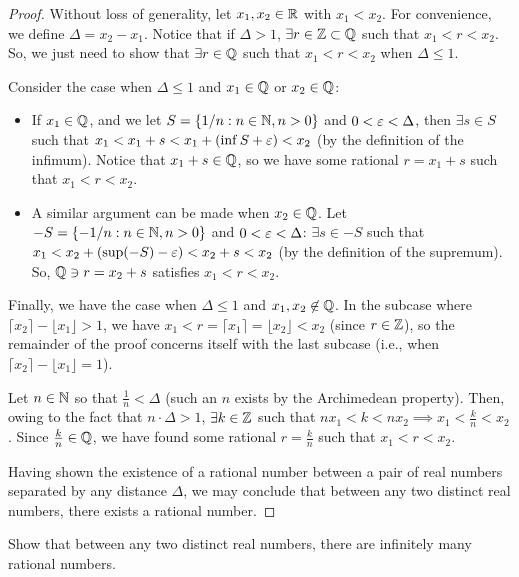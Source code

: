 \begin{proof}
  Without loss of generality, let $x_{1}, x_{2} \in \mathbb{R}$ with
  $x_{1} < x_{2}$. For convenience, we define $\Delta = x_{2} - x_{1}$. Notice
  that if $\Delta > 1$, $\exists r \in \mathbb{Z} \subset \mathbb{Q}$ such that $x_1 < r < x_2$. So, 
  we just need to show that $\exists r \in \mathbb{Q}$ such that $x_{1} < r < x_{2}$ when 
  $\Delta \leq 1$.

  Consider the case when $\Delta \leq 1$ and $x_{1} \in \mathbb{Q}$ or $x_{2} \in \mathbb{Q}$:
  \begin{itemize}
    \item If $x_{1} \in \mathbb{Q}$, and we let $S = \{ 1/n : n \in \mathbb{N}, n > 0 \}$ and
      $0 < \varepsilon < \Delta$, then $\exists s \in S$ such that 
      $x_{1} < x_{1} + s < x_{1} + (\inf S + \varepsilon) < x_{2}$ (by the definition 
      of the infimum). Notice that $x_1 + s \in \mathbb{Q}$, so we have some rational 
      $r = x_{1} + s$ such that $x_{1} < r < x_{2}$. 
    \item A similar argument can be made when $x_{2} \in \mathbb{Q}$. Let $-S = \{ -1/n : n \in \mathbb{N}, n > 0 \}$
      and $0 < \varepsilon < \Delta$: $\exists s \in -S$ such that 
      $x_{1} < x_{2} + (\sup(-S) - \varepsilon) < x_{2} + s < x_{2}$ 
      (by the definition of the supremum). So, $\mathbb{Q} \ni r = x_{2} + s$ satisfies $x_{1} < r < x_{2}$.
  \end{itemize}

  Finally, we have the case when $\Delta \leq 1$ and $x_{1}, x_{2} \not\in \mathbb{Q}$.
  In the subcase where $\lceil x_{2} \rceil - \lfloor x_{1} \rfloor > 1$,
  we have $x_{1} < r = \lceil x_{1} \rceil = \lfloor x_{2} \rfloor < x_{2}$ 
  (since $r \in \mathbb{Z}$), so the remainder of the proof concerns itself with the
  last subcase (i.e., when $\lceil x_{2} \rceil - \lfloor x_{1} \rfloor = 1$).

  Let $n \in \mathbb{N}$ so that $\frac{1}{n} < \Delta$ (such an $n$ exists by the Archimedean property). 
  Then, owing to the fact that $n \cdot \Delta > 1$, $\exists k \in \mathbb{Z}$ such that 
  $nx_{1} < k < nx_{2} \implies x_{1} < \frac{k}{n} < x_{2}$. Since $\frac{k}{n} \in \mathbb{Q}$,
  we have found some rational $r = \frac{k}{n}$ such that $x_{1} < r < x_{2}$.

  Having shown the existence of a rational number between a pair of real numbers separated by any distance $\Delta$,
  we may conclude that between any two distinct real numbers, there exists a rational number.
\end{proof}

\begin{problem}\label{prob:infinite-rationals-in-reals}
  Show that between any two distinct real numbers, there are infinitely many rational numbers.
\end{problem}

